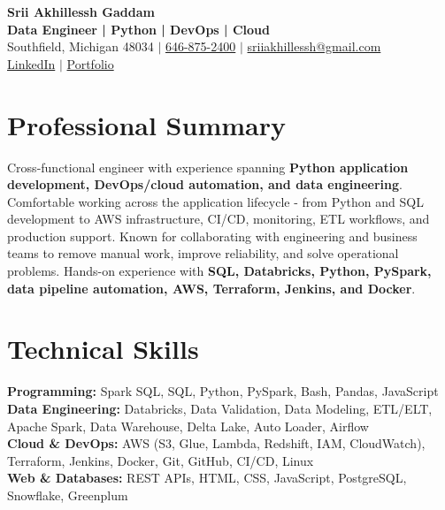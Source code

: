 \documentclass[letterpaper,10pt]{article}
\begin{document}
\fontsize{9.35pt}{10.45pt}\selectfont

\begin{center}
    {\LARGE \textbf{Srii Akhillessh Gaddam}} \\[-1pt]
    \textbf{Data Engineer | Python | DevOps | Cloud} \\[2pt]
    Southfield, Michigan 48034 $|$
    \href{tel:6468752400}{646-875-2400} $|$
    \href{mailto:sriiakhillessh@gmail.com}{sriiakhillessh@gmail.com} \\[1pt]
    \href{https://www.linkedin.com/in/srii-akhiilessh-gaddam-b48668191/}{LinkedIn} $|$
    \href{https://sriiakhillesshg.github.io/portfolio/}{Portfolio}
\end{center}
\vspace{-8pt}

\section{Professional Summary}
\small{Cross-functional engineer with experience spanning \textbf{Python application development, DevOps/cloud automation, and data engineering}. Comfortable working across the application lifecycle - from Python and SQL development to AWS infrastructure, CI/CD, monitoring, ETL workflows, and production support. Known for collaborating with engineering and business teams to remove manual work, improve reliability, and solve operational problems. Hands-on experience with \textbf{SQL, Databricks, Python, PySpark, data pipeline automation, AWS, Terraform, Jenkins, and Docker}.}

\section{Technical Skills}
\small{
\textbf{Programming:} Spark SQL, SQL, Python, PySpark, Bash, Pandas, JavaScript \\
\textbf{Data Engineering:} Databricks, Data Validation, Data Modeling, ETL/ELT, Apache Spark, Data Warehouse, Delta Lake, Auto Loader, Airflow \\
\textbf{Cloud \& DevOps:} AWS (S3, Glue, Lambda, Redshift, IAM, CloudWatch), Terraform, Jenkins, Docker, Git, GitHub, CI/CD, Linux \\
\textbf{Web \& Databases:} REST APIs, HTML, CSS, JavaScript, PostgreSQL, Snowflake, Greenplum
}
\end{document}
